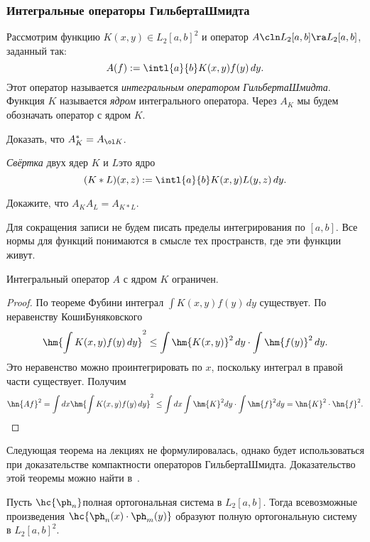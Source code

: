 \documentclass[a4paper]{article}
\begin{document}
\subsubsection{Интегральные операторы Гильберта\ч Шмидта}

\begin{df}
Рассмотрим функцию $K(x,y) \in L_2[a,b]^2$ и
оператор $A\cln L_2[a,b] \ra L_2[a,b]$, заданный так:
$$A(f) := \intl{a}{b}K(x,y)f(y)\,dy.$$
Этот оператор называется \emph{интегральным оператором Гильберта\ч Шмидта}.
Функция $K$ называется \emph{ядром} интегрального оператора. Через $A_K$ мы будем обозначать
оператор с ядром $K$.
\end{df}

\begin{problem}
Доказать, что $A_K^* = A_{\ol K}$.
\end{problem}

\begin{df}
\emph{Свёртка} двух ядер $K$ и $L$\т это ядро
$$(K*L)(x,z) := \intl{a}{b}K(x,y)L(y,z)\,dy.$$
\end{df}

\begin{problem}
Докажите, что $A_K A_L = A_{K*L}$.
\end{problem}

Для сокращения записи не будем писать пределы интегрирования по $[a,b]$.
Все нормы для функций понимаются в смысле тех пространств, где эти функции живут.

\begin{stm}
Интегральный оператор $A$ с ядром $K$ ограничен.
\end{stm}
\begin{proof}
По теореме Фубини интеграл $\int K(x,y)f(y)\,dy$ существует. По неравенству Коши\ч Буняковского
$$\hm{\int K(x,y) f(y)\, dy}^2 \le \int \hm{K(x,y)}^2\,dy \cdot \int \hm{f(y)}^2\,dy.$$
Это неравенство можно проинтегрировать по $x$, поскольку интеграл
в правой части существует. Получим
$$\hn{A f}^2 = \int dx \hm{\int K(x,y)f(y)\,dy}^2 \le \int dx \int \hm{K}^2dy \cdot \int\hm{f}^2dy =
\hn{K}^2\cdot \hn{f}^2.$$
\hfill\end{proof}


Следующая теорема на лекциях не формулировалась, однако будет использоваться
при доказательстве компактности операторов Гильберта\ч Шмидта. Доказательство этой теоремы можно
найти в~\cite[гл.VII, \S~3, п.~5]{kf}.

\begin{theorem}
Пусть $\hc{\ph_n}$\т полная ортогональная система в $L_2[a,b]$. Тогда всевозможные произведения
$\hc{\ph_n(x)\cdot\ph_m(y)}$ образуют полную ортогональную систему в $L_2[a,b]^2$.
\end{theorem}
\end{document}
